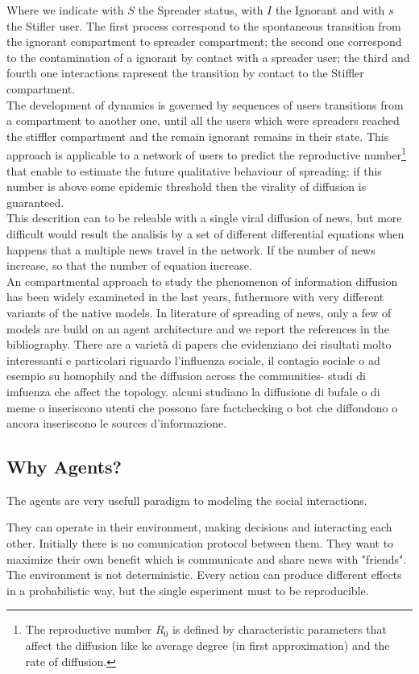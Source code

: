 \documentclass[11pt]{article} %
\begin{document}
Where we indicate with $S$ the Spreader status, with $I$ the Ignorant and with $s$ the Stifler user. The first process correspond to the spontaneous transition from the ignorant compartment to spreader compartment; the second one correspond to the contamination of a ignorant by contact with a spreader user; the third and fourth one interactions rapresent the transition by contact to the Stiffler compartment.  \\
The development of dynamics is governed by sequences of users transitions from a compartment to another one, until all the users which were spreaders reached the stiffler compartment and the remain ignorant remains in their state.
This approach is applicable to a network of users to predict the reproductive number\footnote{The reproductive number $R_{0}$ is defined by characteristic parameters that affect the diffusion like ke average degree (in first approximation) and the rate of diffusion. } that enable to estimate the future qualitative behaviour of spreading: if this number is above some epidemic threshold then the virality of diffusion is guaranteed.\\
This descrition can to be releable with a single viral diffusion of news, but more difficult would result the analisis by a set of different differential equations when happens that a multiple news travel in the network. If the number of news increase, so that the number of equation increase.\\
 An compartmental approach to study the phenomenon of information diffusion has been widely examineted in the last years, futhermore with very different variants of the native models.
 In literature of spreading of news, only a few of models are build on an agent architecture and we report the references in the bibliography.
There are a varietà di papers che evidenziano dei risultati molto interessanti e particolari riguardo l'influenza sociale, il contagio sociale o ad esempio su homophily and the diffusion across the communities- studi di imfuenza che affect the topology. alcuni studiano la diffusione di bufale o di meme o inseriscono utenti che possono fare factchecking o bot che diffondono o ancora inseriscono le sources d'informazione.

\subsection{Why Agents?}
The agents are very usefull paradigm to modeling the social interactions. 

They can operate in their environment, making decisions and interacting each other. Initially
there is no comunication protocol between them. They want to maximize their own benefit which is
communicate and share news with "friends". \\
The environment is not deterministic. Every action can produce different effects in a probabilistic
way, but the single esperiment must to be reproducible.
\end{document}
